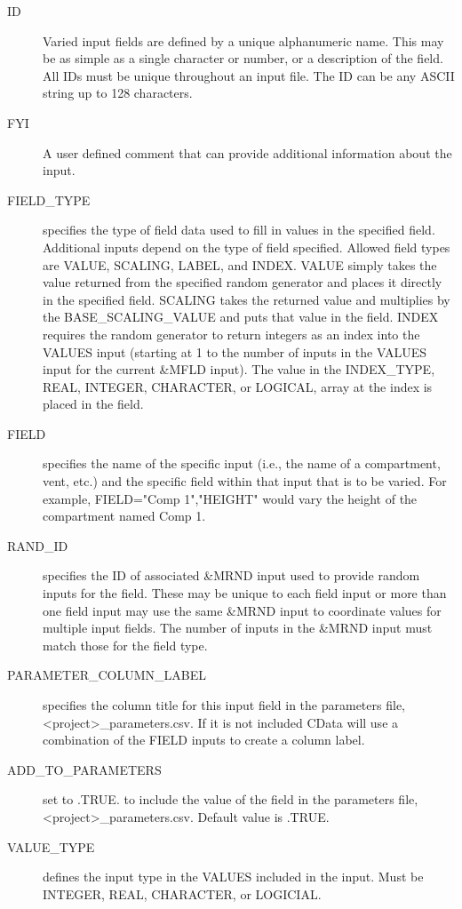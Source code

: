 \documentclass[12pt,twoside]{book}
\begin{document}
\begin{description}
  \item[ID] Varied input fields are defined by a unique alphanumeric name. This may be as simple as a single character or number, or a description of the field. All IDs must be unique throughout an input file.  The { \ct ID} can be any ASCII string up to 128 characters.
  \item[FYI] A user defined comment that can provide additional information about the input.
  \item[FIELD\_TYPE] specifies the type of field data used to fill in values in the specified field. Additional inputs depend on the type of field specified. Allowed field types are {\ct VALUE}, {\ct SCALING}, {\ct LABEL}, and {\ct INDEX}. {\ct VALUE} simply takes the value returned from the specified random generator and places it directly in the specified field. {\ct SCALING} takes the returned value and multiplies by the {\ct BASE\_SCALING\_VALUE} and puts that value in the field. {\ct INDEX} requires the random generator to return integers as an index into the {\ct VALUES} input (starting at 1 to the number of inputs in the {\ct VALUES} input for the current {\ct \&MFLD} input). The value in the {\ct INDEX\_TYPE}, {\ct REAL}, {\ct INTEGER}, {\ct CHARACTER}, or {\ct LOGICAL}, array at the index is placed in the field.
  \item[FIELD] specifies the name of the specific input (i.e., the name of a compartment, vent, etc.) and the specific field within that input that is to be varied. For example, {\ct FIELD="Comp 1","HEIGHT"} would vary the height of the compartment named {\ct Comp 1}.
  \item[RAND\_ID] specifies the ID of associated {\ct \&MRND} input used to provide random inputs for the field. These may be unique to each field input or more than one field input may use the same {\ct \&MRND} input to coordinate values for multiple input fields. The number of inputs in the {\ct \&MRND} input must match those for the field type.
  \item[PARAMETER\_COLUMN\_LABEL] specifies the column title for this input field in the parameters file, {\ct <project>\_parameters.csv}. If it is not included CData will use a combination of the {\ct FIELD} inputs to create a column label.
  \item[ADD\_TO\_PARAMETERS] set to .TRUE. to include the value of the field in the parameters file, {\ct <project>\_parameters.csv}. Default value is .TRUE.
  \item[VALUE\_TYPE] defines the input type in the {\ct VALUES} included in the input. Must be {\ct INTEGER}, {\ct REAL}, {\ct CHARACTER}, or {\ct LOGICIAL}.

\end{description}
\end{document}
